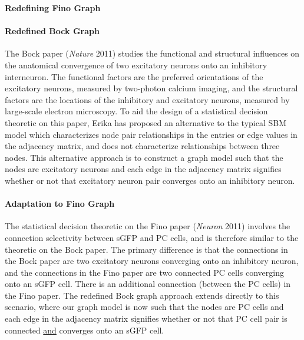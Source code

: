 \documentclass[12pt]{article}
\begin{document}
\begin{center}\Large \bf Redefining Fino Graph \end{center}
\bigskip
\paragraph{Redefined Bock Graph}
The Bock paper ({\it Nature} 2011) studies the functional and structural influences on the anatomical convergence of two excitatory neurons onto an inhibitory interneuron. The functional factors are the preferred orientations of the excitatory neurons, measured by two-photon calcium imaging, and the structural factors are the locations of the inhibitory and excitatory neurons, measured by large-scale electron microscopy. To aid the design of a statistical decision theoretic on this paper, Erika has proposed an alternative to the typical SBM model which characterizes node pair relationships in the entries or edge values in the adjacency matrix, and does not characterize relationships between three nodes. This alternative approach is to construct a graph model such that the nodes are excitatory neurons and each edge in the adjacency matrix signifies whether or not that excitatory neuron pair converges onto an inhibitory neuron. 
\paragraph{Adaptation to Fino Graph}
The statistical decision theoretic on the Fino paper ({\it Neuron} 2011) involves the connection selectivity between sGFP and PC cells, and is therefore similar to the theoretic on the Bock paper. The primary difference is that the connections in the Bock paper are two excitatory neurons converging onto an inhibitory neuron, and the connections in the Fino paper are two connected PC cells converging onto an sGFP cell. There is an additional connection (between the PC cells) in the Fino paper. The redefined Bock graph approach extends directly to this scenario, where our graph model is now such that the nodes are PC cells and each edge in the adjacency matrix signifies whether or not that PC cell pair is connected {\uline{and}} converges onto an sGFP cell. 
\end{document}
